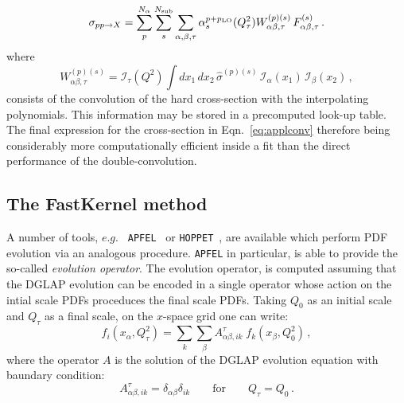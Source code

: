 \documentclass[preprint,12pt]{elsarticle}
\begin{document}
\begin{equation} \label{eq:applconv}
  \sigma_{pp\to X} = \sum_p^{N_\alpha} \sum_{s}^{N_{\mathrm{sub}}} \sum_{\alpha,\beta,\tau} 
  \alpha_s^{p+p_{\rm LO}}(Q^2_\tau)W_{\alpha\beta,\tau}^{(p)(s)} \, F_{\alpha\beta,\tau}^{(s)}\,.
\end{equation}
where
\begin{equation}
  W_{\alpha\beta,\tau}^{(p)(s)} = \mathcal{I}_\tau(Q^2)\int dx_1\,dx_2\,
  \hat{\sigma}^{(p)(s)}\,\mathcal{I}_\alpha(x_1)
  \,\mathcal{I}_\beta(x_2)\,,
\end{equation}
consists of the convolution of the hard cross-section with the interpolating polynomials. This information may be stored in a precomputed look-up table.
The final expression for the cross-section in Eqn.~\ref{eq:applconv} therefore being considerably more computationally efficient inside a fit than the direct
performance of the double-convolution.

\subsection{The FastKernel method}
A number of tools, $e.g.$ {\tt
  APFEL}~\cite{Bertone:2013vaa} or {\tt HOPPET}~\cite{Salam:2008qg},
are available which perform PDF evolution via an analogous
procedure. {\tt APFEL} in particular, is able to provide the so-called
\textit{evolution operator}. The evolution operator, is computed
assuming that the DGLAP evolution can be encoded in a single operator
whose action on the intial scale PDFs proceduces the final scale
PDFs. Taking $Q_0$ as an initial scale and $Q_\tau$ as a final scale,
on the $x$-space grid one can write:
\begin{equation}\label{eq:fastPDFfinal_recalled}
  f_i(x_{\alpha},Q^2_\tau) = \sum_{k}
  \sum_\beta A^\tau_{\alpha\beta, ik}\;
  f_k(x_\beta,Q^2_0)\,, 
\end{equation}
where the operator $A$ is the solution of the DGLAP evolution
equation with baundary condition:
\begin{equation}
A^\tau_{\alpha\beta, ik} =
\delta_{\alpha\beta}\delta_{ik}\qquad\mbox{for}\qquad Q_\tau = Q_0\,.
\end{equation}
\end{document}
